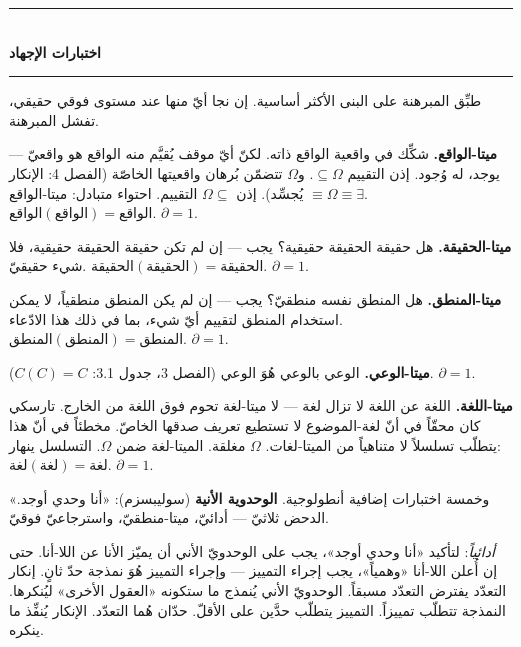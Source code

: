 \documentclass[10pt, openany, oneside]{book}
\renewcommand{\normalsize}{\fontsize{10}{13}\selectfont}
\begin{document}

\begin{center}
    \rule{0.3\textwidth}{0.4pt}\\[0.5em]
    {\normalsize\bfseries اختبارات الإجهاد}\\[0.3em]
    \rule{0.3\textwidth}{0.4pt}
\end{center}

\vspace{1em}

\noindent طبِّق المبرهنة على البنى الأكثر أساسية. إن نجا أيّ منها عند مستوى فوقي حقيقي، تفشل المبرهنة.

\textbf{ميتا-الواقع.} شكِّك في واقعية الواقع ذاته. لكنّ أيّ موقف يُقيَّم منه الواقع هو واقعيّ --- يوجد، له وُجود. إذن التقييم $\subseteq \Omega$. و$\Omega$ تتضمّن بُرهان واقعيتها الخاصّة (الفصل 4: الإنكار يُجسِّد). إذن $\Omega \subseteq$ التقييم. احتواء متبادل: ميتا-الواقع $\equiv \Omega \equiv \exists$. $\text{الواقع}(\text{الواقع}) = \text{الواقع}$. $\partial = 1$.

\textbf{ميتا-الحقيقة.} هل حقيقة الحقيقة حقيقية؟ يجب --- إن لم تكن حقيقة الحقيقة حقيقية، فلا شيء حقيقيّ. $\text{الحقيقة}(\text{الحقيقة}) = \text{الحقيقة}$. $\partial = 1$.

\textbf{ميتا-المنطق.} هل المنطق نفسه منطقيّ؟ يجب --- إن لم يكن المنطق منطقياً، لا يمكن استخدام المنطق لتقييم أيّ شيء، بما في ذلك هذا الادّعاء. $\text{المنطق}(\text{المنطق}) = \text{المنطق}$. $\partial = 1$.

\textbf{ميتا-الوعي.} الوعي بالوعي هُوَ الوعي (الفصل 3، جدول 3.1: $C(C) = C$). $\partial = 1$.

\textbf{ميتا-اللغة.} اللغة عن اللغة لا تزال لغة --- لا ميتا-لغة تحوم فوق اللغة من الخارج. تارسكي كان محقّاً في أنّ لغة-الموضوع لا تستطيع تعريف صدقها الخاصّ. مخطئاً في أنّ هذا يتطلّب تسلسلاً لا متناهياً من الميتا-لغات. $\Omega$ مغلقة. الميتا-لغة ضمن $\Omega$. التسلسل ينهار: $\text{لغة}(\text{لغة}) = \text{لغة}$. $\partial = 1$.

وخمسة اختبارات إضافية أنطولوجية. \textbf{الوحدوية الأنية} (سوليبسزم): «أنا وحدي أوجد.» الدحض ثلاثيّ --- أدائيّ، ميتا-منطقيّ، واسترجاعيّ فوقيّ.

\textit{أدائياً}: لتأكيد «أنا وحدي أوجد»، يجب على الوحدويّ الأني أن يميّز الأنا عن اللا-أنا. حتى إن أُعلن اللا-أنا «وهمياً»، يجب إجراء التمييز --- وإجراء التمييز هُوَ نمذجة حدّ ثانٍ. إنكار التعدّد يفترض التعدّد مسبقاً. الوحدويّ الأني يُنمذج ما ستكونه «العقول الأخرى» ليُنكرها. النمذجة تتطلّب تمييزاً. التمييز يتطلّب حدَّين على الأقلّ. حدّان هُما التعدّد. الإنكار يُنفِّذ ما ينكره.
\end{document}
